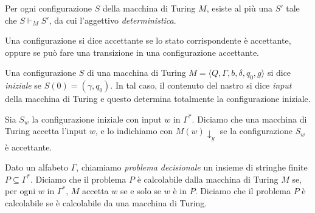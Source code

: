 \begin{osservazione}
 Per ogni configurazione $S$ della macchina di Turing $M$, esiste al più una
 $S'$ tale che $S \vdash_M S'$, da cui l'aggettivo \emph{deterministica}.
\end{osservazione}


\begin{definizione}
 Una configurazione si dice accettante se lo stato corrispondente è accettante,
 oppure se può fare una transizione in una configurazione accettante.
\end{definizione}

\begin{definizione}
 Una configurazione $S$ di una macchina di Turing
 $M=\langle Q, \Gamma, b, \delta, q_0, g \rangle$ si dice \emph{iniziale} se
 $S(0) = (\gamma, q_0)$. In tal caso, il contenuto del nastro
 si dice \emph{input} della macchina di Turing e questo determina totalmente
 la configurazione iniziale.
\end{definizione}

\begin{definizione}
\label{def:accept-input}
 Sia $S_w$ la configurazione iniziale con input $w$ in $\Gamma^\ast$. Diciamo che
 una macchina di Turing accetta l'input $w$, e lo indichiamo con $M(w)\downarrow_y$
 se la configurazione $S_w$ è accettante.
\end{definizione}

\begin{definizione}
\label{def:problem}
 Dato un alfabeto $\Gamma$, chiamiamo \emph{problema decisionale} un insieme di stringhe finite
 $P \subseteq \Gamma^\ast$. Diciamo che il problema $P$ è calcolabile dalla macchina
 di Turing $M$ se, per ogni $w$ in $\Gamma^\ast$, $M$ accetta $w$ se e solo se $w$
 è in $P$. Diciamo che il problema $P$ è calcolabile se è calcolabile da una
 macchina di Turing.
\end{definizione}


